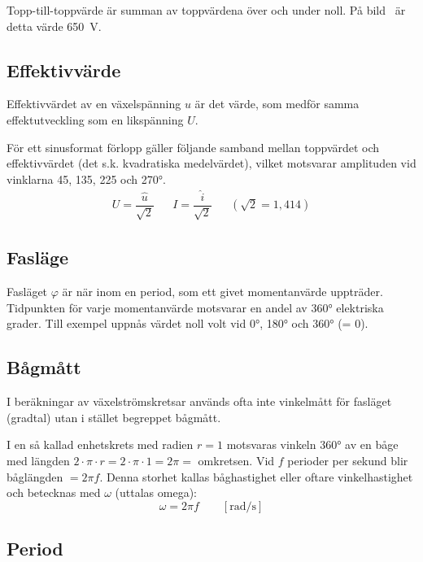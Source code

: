 Topp-till-toppvärde är summan av toppvärdena över och under noll.
På bild~ är detta värde \qty{650}{\volt}.

\subsection{Effektivvärde}
\label{effektivvärde}

Effektivvärdet av en växelspänning \(u\) är det värde, som medför samma
effektutveckling som en likspänning \(U\).

För ett sinusformat förlopp gäller följande samband mellan toppvärdet och
effektivvärdet (det s.k. kvadratiska medelvärdet), vilket motsvarar amplituden
vid vinklarna 45, 135, 225 och \ang{270}.
\[
\begin{array}{lllll}
U=\dfrac{\hat{u}}{\sqrt{2}} & & I=\dfrac{\hat{i}}{\sqrt{2}} & & (\sqrt{2} = 1,414)
\end{array}
\]
\subsection{Fasläge}

Fasläget \(\varphi\) är när inom en period, som ett givet momentanvärde
uppträder.
Tidpunkten för varje momentanvärde motsvarar en andel av \ang{360} elektriska
grader.
Till exempel uppnås värdet noll volt vid \ang{0}, \ang{180} och \ang{360} (= 0\degree).

\subsection{Bågmått}

I beräkningar av växelströmskretsar används ofta inte vinkelmått för fasläget
(gradtal) utan i stället begreppet bågmått.

I en så kallad enhetskrets med radien \(r = 1\) motsvaras vinkeln \ang{360} av
en båge med längden \(2 \cdot \pi \cdot r= 2 \cdot \pi \cdot 1 = 2 \pi =\)
omkretsen.
Vid \(f\) perioder per sekund blir båglängden \(= 2\pi f\).
Denna storhet kallas båghastighet eller oftare vinkelhastighet och betecknas
med \(\omega\) (uttalas omega):
\[\omega= 2\pi f\qquad [\text{rad/s}]\]
\subsection{Period}
\label{period}

